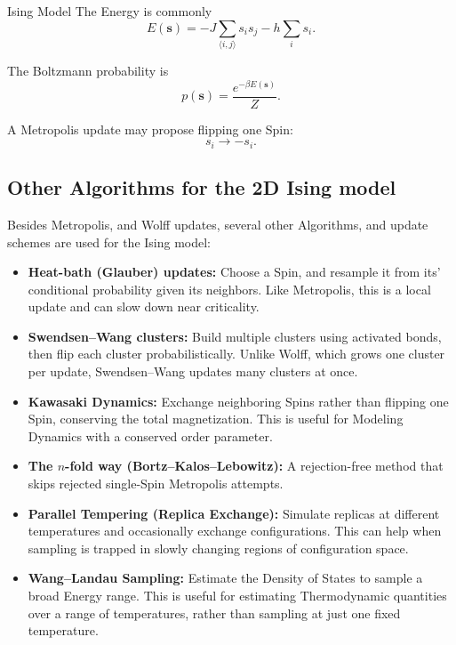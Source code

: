 \documentclass[a4paper, 10pt, onepage]{elegantbook}
\begin{document}
{\begin{frame}{Ising Model}
  The Energy is commonly
  \[
    E(\mathbf{s})
    =
    -J\sum_{\langle i,j\rangle}s_is_j
    -
    h\sum_i s_i.
  \]

  The Boltzmann probability is
  \[
    p(\mathbf{s})
    =
    \frac{e^{-\beta E(\mathbf{s})}}{Z}.
  \]

  A Metropolis update may propose flipping one Spin:
  \[
    s_i\rightarrow-s_i.
  \]
\end{frame}

\subsection{Other Algorithms for the 2D Ising model}

Besides Metropolis, and Wolff updates, several other Algorithms, and
update schemes are used for the Ising model:

\begin{itemize}
  \item \textbf{Heat-bath (Glauber) updates:}
  Choose a Spin, and resample it from its' conditional probability given
  its neighbors. Like Metropolis, this is a local update and can slow
  down near criticality.

  \item \textbf{Swendsen--Wang clusters:}
  Build multiple clusters using activated bonds, then flip each cluster
  probabilistically. Unlike Wolff, which grows one cluster per update,
  Swendsen--Wang updates many clusters at once.

  \item \textbf{Kawasaki Dynamics:}
  Exchange neighboring Spins rather than flipping one Spin, conserving
  the total magnetization. This is useful for Modeling Dynamics with a
  conserved order parameter.

  \item \textbf{The \(n\)-fold way (Bortz--Kalos--Lebowitz):}
  A rejection-free method that skips rejected single-Spin Metropolis
  attempts.

  \item \textbf{Parallel Tempering (Replica Exchange):}
  Simulate replicas at different temperatures and occasionally exchange
  configurations. This can help when sampling is trapped in slowly
  changing regions of configuration space.

  \item \textbf{Wang--Landau Sampling:}
  Estimate the Density of States to sample a broad Energy range. This is
  useful for estimating Thermodynamic quantities over a range of
  temperatures, rather than sampling at just one fixed temperature.


\end{itemize}}
\end{document}
